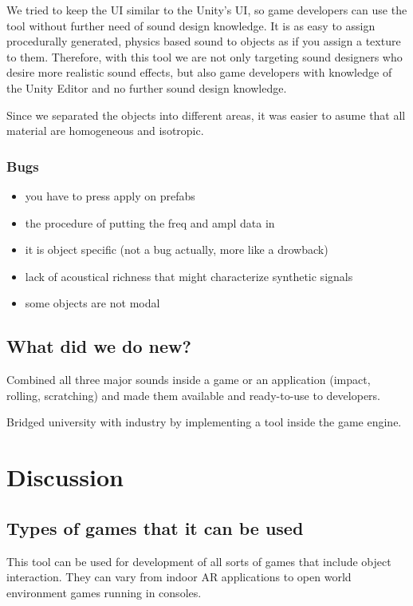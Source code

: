 We tried to keep the \gls{UI} similar to the Unity\textsuperscript{\textregistered}'s \gls{UI}, so game developers can use the tool without further need of sound design knowledge. It is as easy to assign procedurally generated, physics based sound to objects as if you assign a texture to them. Therefore, with this tool we are not only targeting sound designers who desire more realistic sound effects, but also game developers with knowledge of the Unity\textsuperscript{\textregistered} Editor and no further sound design knowledge. 

Since we separated the objects into different areas, it was easier to asume that all material are homogeneous and isotropic. 

\subsubsection{Bugs}
\begin{itemize}
\item you have to press apply on prefabs
\item the procedure of putting the freq and ampl data in
\item it is object specific (not a bug actually, more like a drowback)
\item lack of acoustical richness that might characterize synthetic signals \cite{giordano2006material}
\item some objects are not modal
\end{itemize}

\subsection{What did we do new?}
Combined all three major sounds inside a game or an application (impact, rolling, scratching) and made them available and ready-to-use to developers.

Bridged university with industry by implementing a tool inside the game engine.

\section{Discussion}

\subsection{Types of games that it can be used}
This tool can be used for development of all sorts of games that include object interaction. They can vary from indoor AR applications to open world environment games running in consoles. 


